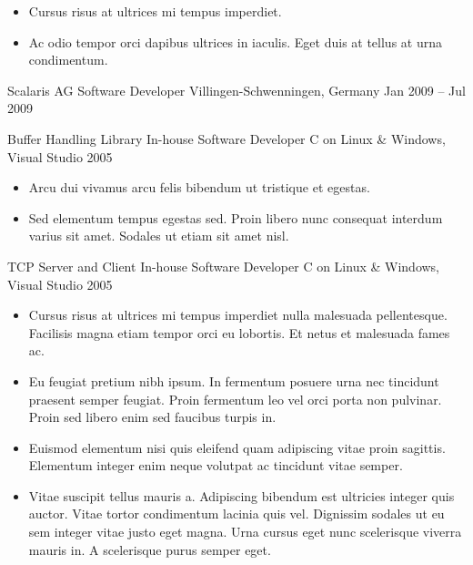 \documentclass[10pt, a4paper]{cvhari}
\begin{document}
            \begin{itemize}
                \item Cursus risus at ultrices mi tempus imperdiet. \smallskip
                \item Ac odio tempor orci dapibus ultrices in iaculis. Eget duis at tellus at urna condimentum.\smallskip
            \end{itemize}

\smallskip
\divider
\smallskip

    \company
        {Scalaris AG}
        {Software Developer}
        {Villingen-Schwenningen, Germany}
        {Jan 2009 – Jul 2009}
        
        \project
            {Buffer Handling Library}
            {In-house}
            {Software Developer}
            {C on Linux \& Windows, Visual Studio 2005}
    
            \begin{itemize}
                \item Arcu dui vivamus arcu felis bibendum ut tristique et egestas.\smallskip
                
                \item Sed elementum tempus egestas sed. Proin libero nunc consequat interdum varius sit amet. Sodales ut etiam sit amet nisl.
            \end{itemize}

        \dividergray
        
        \project
            {TCP Server and Client}
            {In-house}
            {Software Developer}
            {C on Linux \& Windows, Visual Studio 2005}
    
            \begin{itemize}
                \item Cursus risus at ultrices mi tempus imperdiet nulla malesuada pellentesque. Facilisis magna etiam tempor orci eu lobortis. Et netus et malesuada fames ac.\smallskip
                
                \item Eu feugiat pretium nibh ipsum. In fermentum posuere urna nec tincidunt praesent semper feugiat. Proin fermentum leo vel orci porta non pulvinar. Proin sed libero enim sed faucibus turpis in. 
                
                \item Euismod elementum nisi quis eleifend quam adipiscing vitae proin sagittis. Elementum integer enim neque volutpat ac tincidunt vitae semper. 
                
                \item Vitae suscipit tellus mauris a. Adipiscing bibendum est ultricies integer quis auctor. Vitae tortor condimentum lacinia quis vel. Dignissim sodales ut eu sem integer vitae justo eget magna. Urna cursus eget nunc scelerisque viverra mauris in. A scelerisque purus semper eget. 
            \end{itemize}
\end{document}
